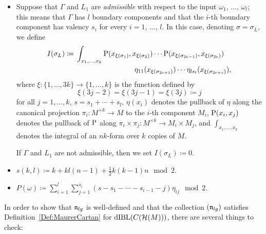 \documentclass[\MainFolder/Text.tex]{subfiles}
\begin{document}
\begin{Def}
\begin{itemize}
\item Suppose that $\Gamma$ and $L_1$ are \emph{admissible} with respect to the input $\omega_1$, $\dotsc$, $\omega_l$; this means that $\Gamma$ has $l$ boundary components and that the $i$-th boundary component has valency $s_i$ for every $i=1$, $\dotsc$, $l$. In this case, denoting $\sigma = \sigma_L$, we define
\begin{equation} \label{Eq:ISigma}
I(\sigma_L) \coloneqq \begin{multlined}[t]\int_{x_1,\dotsc,x_k} \Prpg(x_{\xi(\sigma_1)},x_{\xi(\sigma_2)}) \dotsm \Prpg(x_{\xi(\sigma_{2e-1})},x_{\xi(\sigma_{2e})}) \\ \eta_{11}(x_{\xi(\sigma_{2e+1})}) \dotsm \eta_{ls_{l}}(x_{\xi(\sigma_{2e+s})}),\end{multlined}
\end{equation}
where $\xi: \{1,\dotsc, 3k\} \rightarrow \{1,\dotsc,k\}$ is the function defined by 
$$ \xi(3j-2) = \xi(3j-1) = \xi(3j) \coloneqq j $$ for all $j=1, \dotsc, k$, $s = s_1 + \dotsb + s_l$, $\eta_{}(x_i)$ denotes the pullback of $\eta$ along the canonical projection $\pi_i: M^{\times k} \rightarrow M$ to the $i$-th component $M_i$, $\mathrm{P}(x_i, x_j)$ denotes the pullback of $\mathrm{P}$ along $\pi_{i} \times \pi_j : M^{\times k} \rightarrow M_i \times M_j$, and $\int_{x_1,\dotsc,x_k}$ denotes the integral of an $nk$-form over $k$ copies of $M$.

If $\Gamma$ and $L_1$ are not admissible, then we set $I(\sigma_L)\coloneqq 0$.
\item $s(k,l) \coloneqq k + kl(n-1) + \frac{1}{2} k(k-1) n \mod 2$.
\item $P(\omega) \coloneqq  \sum_{i=1}^l \sum_{j=1}^{s_i} (s - s_1 - \dotsb - s_{i-1} - j) \eta_{ij} \mod 2$.
\end{itemize}
\end{Def}
\noindent %
In order to show that $\mathfrak{n}_{lg}$ is well-defined and that the collection $(\mathfrak{n}_{lg})$ satisfies Definition~\ref{Def:MaurerCartan} for $\mathrm{dIBL}(C(\mathcal{H}(M)))$, there are several things to check:
\end{document}
